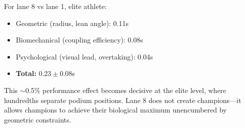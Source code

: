 For lane 8 vs lane 1, elite athlete:
\begin{itemize}
    \item Geometric (radius, lean angle): 0.11s
    \item Biomechanical (coupling efficiency): 0.08s
    \item Psychological (visual lead, overtaking): 0.04s
    \item \textbf{Total:} $\mathbf{0.23 \pm 0.08}$s
\end{itemize}

This $\sim$0.5\% performance effect becomes decisive at the elite level, where hundredths separate podium positions. Lane 8 does not create champions—it allows champions to achieve their biological maximum unencumbered by geometric constraints.
